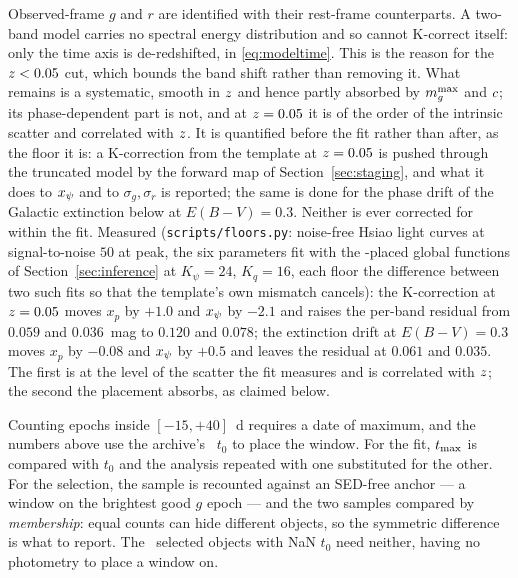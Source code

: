 \documentclass[11pt]{article}
\theoremstyle{plain}
\begin{document}
Observed-frame $g$ and $r$ are identified with their rest-frame counterparts. A two-band
model carries no spectral energy distribution and so cannot K-correct itself: only the time
axis is de-redshifted, in \eqref{eq:modeltime}. This is the reason for the $z < 0.05$
cut, which bounds the band shift rather than removing it. What remains is a systematic,
smooth in $z$ and hence partly absorbed by $m_{g}^{\max}$ and $c$; its phase-dependent
part is not, and at $z = 0.05$ it is of the order of the intrinsic scatter and
correlated with $z$. It is quantified before the fit rather than after, as the floor
it is: a K-correction from the \citet{Hsiao2007} template at $z = 0.05$ is pushed
through the truncated model by the forward map of
Section~\ref{sec:staging}, and what it does to $x_{\psi}$ and to $\sigma_{g}, \sigma_{r}$
is reported; the same is done for the phase drift of the Galactic extinction below at
$E(B-V) = 0.3$. Neither is ever corrected for within the fit. Measured
(\texttt{scripts/floors.py}: noise-free Hsiao light curves at signal-to-noise $50$ at
peak, the six parameters fit with the \salt-placed global functions of
Section~\ref{sec:inference} at $K_{\psi} = 24$, $K_{q} = 16$, each floor the difference
between two such fits so that the template's own mismatch cancels): the K-correction at
$z = 0.05$ moves $x_p$ by $+1.0$ and $x_{\psi}$ by $-2.1$ and raises the per-band
residual from $0.059$ and $0.036$~mag to $0.120$ and $0.078$; the extinction drift at
$E(B-V) = 0.3$ moves $x_p$ by $-0.08$ and $x_{\psi}$ by $+0.5$ and leaves the residual
at $0.061$ and $0.035$. The first is at the level of the scatter the fit measures and is
correlated with $z$; the second the placement absorbs, as claimed below.

Counting epochs inside $[-15,+40]$~d requires a date of
maximum, and the numbers above use the archive's \salt\ $t_{0}$ to place the window.
For the fit,
$t_{\mathrm{max}}$ is compared with $t_{0}$ and the analysis repeated with one substituted for the
other. For the selection, the sample is
recounted against an SED-free anchor --- a window on the brightest good $g$ epoch --- and
the two samples compared by \emph{membership}: equal counts can hide different objects, so
the symmetric difference is what to report. The \Nnolc\ selected objects with NaN $t_{0}$
need neither, having no photometry to place a window on.
\end{document}
